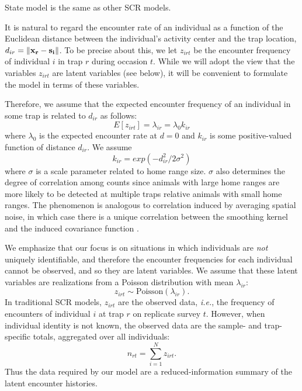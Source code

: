 State model is the same as other SCR models.


It is natural to regard the encounter rate of an individual
as a function of the Euclidean distance between the individual's
activity center and the trap location, $d_{ir} = \| {\bf x_r} - {\bf
  s_i} \|$.
To be precise about this, we let $z_{irt}$ be the encounter frequency
of
individual $i$ in trap $r$ during occasion $t$. While we will adopt the view
that  the variables $z_{irt}$ are latent variables (see below), it will
be convenient to formulate the model in terms of these variables.

Therefore, we assume that the expected encounter frequency of an
individual in some trap is related to $d_{ir}$ as follows:
\[
E[z_{irt}] = \lambda_{ir} = \lambda_0 k_{ir}
\]
where $\lambda_0$ is the expected encounter rate at $d=0$ and $k_{ir}$
is some positive-valued
function of distance $d_{ir}$. We assume
\[
k_{ir} = exp(-d_{ir}^2 / 2\sigma^2)
\]
where $\sigma$ is a scale parameter related to home
range size. $\sigma$ also determines the degree of correlation among
counts since animals with large home ranges are more likely to be
detected at multiple traps relative animals with small home ranges.
The phenomenon is analogous to correlation induced by averaging
spatial noise, in which case there is a unique correlation between the
smoothing kernel and the induced covariance function
\citep{higdon:2002}.

We emphasize that our focus is on
situations in which individuals are {\it not}
uniquely identifiable, and therefore the encounter frequencies
for each individual
cannot be observed, and so they are latent variables. We assume that
these latent variables are realizations from a Poisson distribution
with mean $\lambda_{ir}$:
\begin{equation}
 z_{irt} \sim \mbox{Poisson}(\lambda_{ir}).
\label{eq.latentPoisson}
\end{equation}
In traditional SCR models, $z_{irt}$ are the observed data, {\it
  i.e.}, the frequency of encounters of individual $i$ at trap $r$ on
replicate survey $t$. However, when individual identity is not known,
the observed data are the sample- and trap-specific totals,
aggregated over all individuals:
\[
n_{rt} = \sum_{i=1}^{N} z_{irt}.
\]
Thus the data required by our model are a reduced-information
summary of the latent encounter histories.


